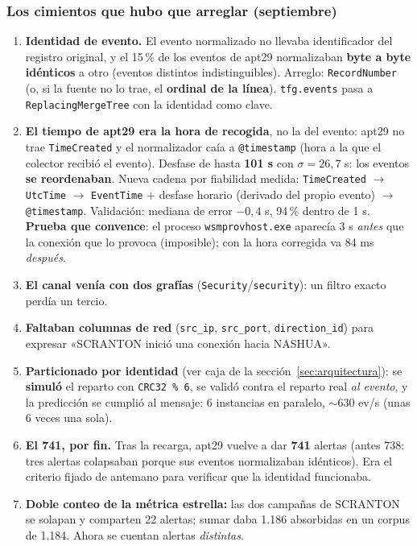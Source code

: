 \documentclass[11pt,a4paper]{article}
\newcommand{\cod}[1]{\texttt{#1}}
\newcommand{\flecha}{$\rightarrow$}
\begin{document}
\subsubsection*{Los cimientos que hubo que arreglar (septiembre)}
\begin{enumerate}
  \item \textbf{Identidad de evento.} El evento normalizado no llevaba identificador del registro original,
        y el 15\,\% de los eventos de apt29 normalizaban \textbf{byte a byte idénticos} a otro (eventos distintos
        indistinguibles). Arreglo: \cod{RecordNumber} (o, si la fuente no lo trae, el \textbf{ordinal de la línea}).
        \cod{tfg.events} pasa a \cod{ReplacingMergeTree} con la identidad como clave.
  \item \textbf{El tiempo de apt29 era la hora de recogida}, no la del evento: apt29 no trae \cod{TimeCreated} y el
        normalizador caía a \cod{@timestamp} (hora a la que el colector recibió el evento). Desfase de hasta
        \textbf{101 s} con $\sigma = 26{,}7$ s: los eventos \textbf{se reordenaban}. Nueva cadena por fiabilidad
        medida: \cod{TimeCreated} \flecha{} \cod{UtcTime} \flecha{} \cod{EventTime} + desfase horario (derivado del
        propio evento) \flecha{} \cod{@timestamp}. Validación: mediana de error $-0{,}4$ s, 94\,\% dentro de 1 s.
        \textbf{Prueba que convence}: el proceso \cod{wsmprovhost.exe} aparecía 3 s \textit{antes} que la conexión que
        lo provoca (imposible); con la hora corregida va 84 ms \textit{después}.
  \item \textbf{El canal venía con dos grafías} (\cod{Security}/\cod{security}): un filtro exacto perdía un tercio.
  \item \textbf{Faltaban columnas de red} (\cod{src\_ip}, \cod{src\_port}, \cod{direction\_id}) para expresar
        «SCRANTON inició una conexión hacia NASHUA».
  \item \textbf{Particionado por identidad} (ver caja de la sección~\ref{sec:arquitectura}): se \textbf{simuló} el
        reparto con \cod{CRC32 \% 6}, se validó contra el reparto real \textit{al evento}, y la predicción se cumplió
        al mensaje: 6 instancias en paralelo, $\sim$630 ev/s (unas 6 veces una sola).
  \item \textbf{El 741, por fin.} Tras la recarga, apt29 vuelve a dar \textbf{741} alertas (antes 738: tres alertas
        colapsaban porque sus eventos normalizaban idénticos). Era el criterio fijado de antemano para
        verificar que la identidad funcionaba.
  \item \textbf{Doble conteo de la métrica estrella:} las dos campañas de SCRANTON se solapan y comparten 22
        alertas; sumar daba 1.186 absorbidas en un corpus de 1.184. Ahora se cuentan alertas \textit{distintas}.
\end{enumerate}
\end{document}
